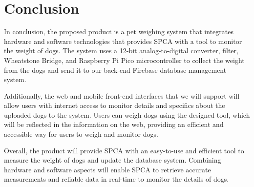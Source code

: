 
\chapter{Conclusion}

In conclusion, the proposed product is a pet weighing system that integrates hardware and software technologies that provides SPCA with a tool to monitor the weight of dogs. The system uses a 12-bit analog-to-digital converter, filter, Wheatstone Bridge, and Raspberry Pi Pico microcontroller to collect the weight from the dogs and send it to our back-end Firebase database management system.

Additionally, the web and mobile front-end interfaces that we will support will allow users with internet access to monitor details and specifics about the uploaded dogs to the system. Users can weigh dogs using the designed tool, which will be reflected in the information on the web, providing an efficient and accessible way for users to weigh and monitor dogs.

Overall, the product will provide SPCA with an easy-to-use and efficient tool to measure the weight of dogs and update the database system. Combining hardware and software aspects will enable SPCA to retrieve accurate measurements and reliable data in real-time to monitor the details of dogs.